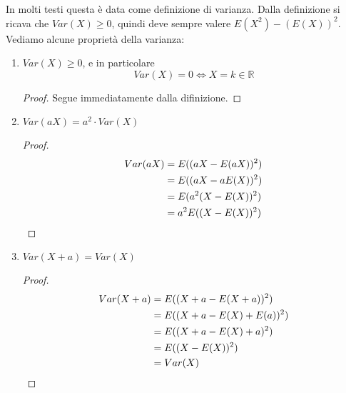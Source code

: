 \documentclass{article}
\theoremstyle{plain}
\theoremstyle{definition}
\theoremstyle{remark}
\begin{document}
In molti testi questa è data come definizione di varianza. Dalla definizione si ricava che $Var(X)\geq 0$, quindi deve sempre valere $E(X^2)-(E(X))^2$. Vediamo alcune proprietà della varianza:
\begin{enumerate}
	\item $Var(X)\geq0$, e in particolare
	\begin{equation*}
		Var(X)=0\Leftrightarrow X=k\in\mathds{R}
	\end{equation*}
	\begin{proof}
		Segue immediatamente dalla difinizione.
	\end{proof}
	\item $Var(aX)=a^2\cdot Var(X)$
	\begin{proof}
		\begin{align*}
			Var(aX)&=E((aX-E(aX))^2)\\
			&=E((aX-aE(X))^2)\\
			&=E(a^2(X-E(X))^2)\\
			&=a^2E((X-E(X))^2)\qedhere
		\end{align*}
	\end{proof}
	\item $Var(X+a)=Var(X)$
	\begin{proof}
		\begin{align*}
			Var(X+a)&=E((X+a-E(X+a))^2)\\
			&=E((X+a-E(X)+E(a))^2)\\
			&=E((X+a-E(X)+a)^2)\\
			&=E((X-E(X))^2)\\
			&=Var(X)\qedhere
		\end{align*}
	\end{proof}
\end{enumerate}
\end{document}
